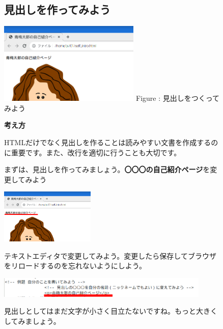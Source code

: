 \documentclass[a4paper,12pt]{jarticle}
\begin{document}
\vfill
\clearpage
\begin{figure}[ht]
  \subsection{\theExercise 見出しを作ってみよう}


  \centering
  \begin{minipage}{0.6\textwidth}
    {\upshape
      \includegraphics[width=0.6\textwidth]{textbook-img153.png}
      \newline
      Figure : 見出しをつくってみよう}
  \end{minipage}


  \bigskip
  \flushleft

  \textbf{考え方}



  \begin{minipage}{\textwidth}
    \flushleft

    HTMLだけでなく見出しを作ることは読みやすい文書を作成するのに重要です。また、改行を適切に行うことも大切です。

    まずは、見出しを作ってみましょう。\textbf{〇〇〇の自己紹介ページ}を変更してみよう


    \bigskip

    \includegraphics[width=0.4\textwidth]{textbook-img154.png}


    \bigskip

    テキストエディタで変更してみよう。変更したら保存してブラウザをリロードするのを忘れないようにしよう。


    \bigskip

    \includegraphics[width=0.9\textwidth]{textbook-img155.png}


    \bigskip


    見出しとしてはまだ文字が小さく目立たないですね。もっと大きくしてみましょう。




    \bigskip
  \end{minipage}

\end{figure}
\end{document}
